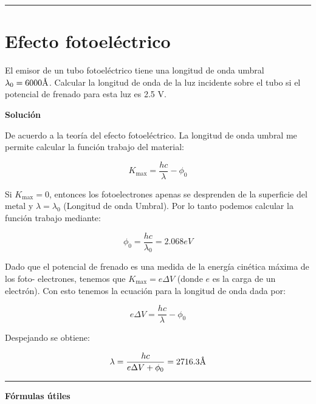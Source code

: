 \documentclass[12pt]{article}
\newcommand{\angstrom}{\mbox{\normalfont\AA}}
\begin{document}
\noindent\rule{16.5cm}{0.4pt}


\section{Efecto fotoeléctrico}

El emisor de un tubo fotoeléctrico tiene una longitud de onda umbral $\lambda_0= 6000 \angstrom$. Calcular la longitud de onda de la luz incidente sobre el tubo si el potencial de frenado para esta luz es 2.5 V.


\begin{center}
	\textbf{Solución}
\end{center}

De acuerdo a la teoría del efecto fotoeléctrico. La longitud de onda umbral me permite
calcular la función trabajo del material:

\begin{equation*}
K_{\text{max}} = \frac{hc}{\lambda} - \phi_0
\end{equation*}

Si $K_{\text{max}} = 0$, entonces los fotoelectrones apenas se desprenden de la superficie del metal
y $\lambda = \lambda_0$ (Longitud de onda Umbral). Por lo tanto podemos calcular la función trabajo
mediante:

\begin{equation*}
\phi_0 = \frac{hc}{\lambda_0} = 2.068 eV
\end{equation*}


Dado que el potencial de frenado es una medida de la energía cinética máxima de los foto-
electrones, tenemos que $K_{\text{max}} = e\Delta V$ (donde $e$ es la carga de un electrón). Con esto tenemos la ecuación para la longitud de onda dada por:


\begin{equation*}
 e\Delta V = \frac{hc}{\lambda}- \phi_0
\end{equation*}

Despejando se obtiene:

\begin{equation*}
\lambda = \frac{hc}{e\Delta V +\phi_0} = 2716.3  \angstrom
\end{equation*}


\noindent\rule{16.5cm}{0.4pt}



\begin{center}
\textbf{Fórmulas útiles}
\end{center}
\end{document}
